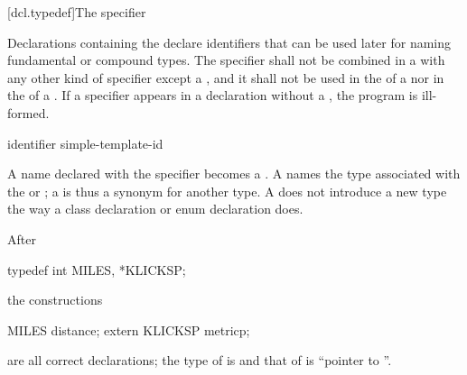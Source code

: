 [dcl.typedef]{The  specifier}%

\pnum
Declarations containing the  
declare identifiers that can be used later for naming
fundamental or compound
types. The  specifier shall not be
combined in a  with any other kind of
specifier except a , and it shall not be used in the
 of a
 nor in the
 of a
.
If a  specifier appears in a declaration without a ,
the program is ill-formed.

\begin{bnf}
\br
    identifier\br
    simple-template-id
\end{bnf}

A name declared with the  specifier becomes a
.
A  names
the type associated with the 
or ;
%
%
%
a  is thus a synonym for another type. A
 does not introduce a new type the way a class
declaration or enum declaration does.
\begin{example}
After

\begin{codeblock}
typedef int MILES, *KLICKSP;
\end{codeblock}

the constructions

\begin{codeblock}
MILES distance;
extern KLICKSP metricp;
\end{codeblock}

are all correct declarations; the type of  is
 and that of  is ``pointer to ''.
\end{example}

